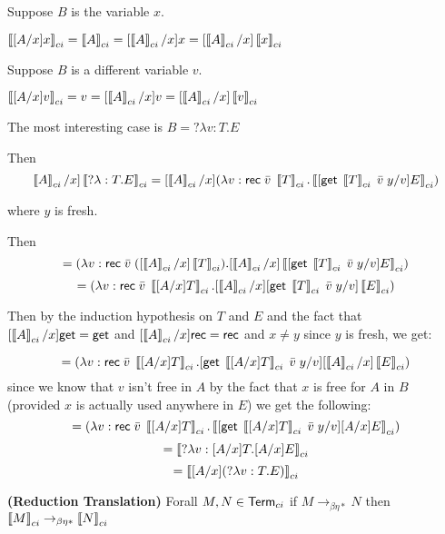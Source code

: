 \begin{tcases}
Suppose $B$ is the variable $x$.
\end{tcases}

$\CICCproj{[A/x] x} = \CICCproj{A} = [\CICCproj{A}/x]x = [\CICCproj{A} / x ] \CICCproj{x}$

\begin{tcases}
Suppose $B$ is a different variable $v$.
\end{tcases}

$\CICCproj{[A/x] v} = v = [\CICCproj{A}/x]v = [\CICCproj{A} / x ] \CICCproj{v}$

\begin{tcases}
The most interesting case is $B = ?\lambda v : T . E$
\end{tcases}

Then
\[
\CICCproj{A}/x ]\CICCproj{? \lambda : T . E } 
= [ \CICCproj{A} / x ] ( \lambda v : \m{rec} \; \bar{v} \;\CICCproj{T} . 
   \CICCproj{ [ \m{get} \; \CICCproj{T} \; \bar{v} \; y / v ] E } )
\]

where $y$ is fresh.

Then 
\[
= ( \lambda v : \m{rec} \; \bar{v} \;([ \CICCproj{A} / x ] \CICCproj{T}) . 
    [ \CICCproj{A} / x ] \CICCproj{ [ \m{get} \; \CICCproj{T} \; \bar{v} \; y / v ] E } )
\]
\[
= ( \lambda v : \m{rec} \; \bar{v} \;\CICCproj{[ A / x] T} . 
    [ \CICCproj{A} / x ] [ \m{get} \; \CICCproj{T} \; \bar{v} \; y / v ] \CICCproj{E } )
\]

Then by the induction hypothesis on $T$ and $E$ and the fact that 
$[\CICCproj{A} / x ] \m{get} = \m{get}$ 
and $[\CICCproj{A} / x ] \m{rec} = \m{rec}$ 
and $x \neq y$ since $y$ is fresh, we get: 

\[
= ( \lambda v : \m{rec} \; \bar{v} \;\CICCproj{[ A / x] T} . 
   [ \m{get} \; \CICCproj{[A / x ]T} \; \bar{v} \; y / v ]  [ \CICCproj{A} / x ] \CICCproj{E } )
\]
since we know that $v$ isn't free in $A$ by the fact that $x$ is free for $A$ in $B$ 
(provided $x$ is actually used anywhere in $E$) we get the following:
\[
= ( \lambda v : \m{rec} \; \bar{v} \;\CICCproj{[ A / x] T} . 
   \CICCproj{ [ \m{get} \; \CICCproj{[A / x ]T} \; \bar{v} \; y / v ] [ A / x ] E } )
\]
\[
= \CICCproj{ ?\lambda v : [ A / x] T . [ A / x ] E }
\]
\[
= \CICCproj{ [ A / x] (?\lambda v : T . E) }
\]

\begin{lemma}
\textbf{(Reduction Translation)}
Forall $M, N \in \m{Term}_{ci}$ if $M \rightarrow_{\beta\eta*} N$ then 
$\CICCproj{M} \rightarrow_{\beta\eta*} \CICCproj{N}$
\label{cicc:red}
\end{lemma}

